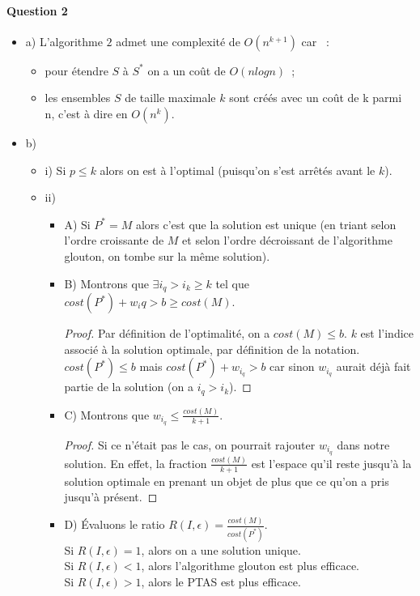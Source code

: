 \paragraph{Question 2}
\begin{itemize}
\item a) L'algorithme $2$ admet une complexité de $O(n^{k+1})$ car ~:
\begin{itemize}
\item pour étendre $S$ à $S^*$ on a un coût de $O(nlogn)$~;
\item les ensembles $S$ de taille maximale $k$ sont créés avec un coût
de k parmi n, c'est à dire en $O(n^k)$.
\end{itemize}
\item b)
\begin{itemize}
\item i) Si $p \leq k$ alors on est à l'optimal (puisqu'on s'est
arrêtés avant le $k$).
\item ii)
\begin{itemize}
\item A) Si $P^*=M$ alors c'est que la solution est unique (en triant
selon l'ordre croissante de $M$ et selon l'ordre décroissant de
l'algorithme glouton, on tombe sur la même solution).
\item B) Montrons que $\exists i_q > i_k \geq k$ tel que
$cost(P^*)+w_iq > b \geq cost(M)$.
\begin{proof}
Par définition de l'optimalité, on a $cost(M) \leq b$. $k$ est
l'indice associé à la solution optimale, par définition de la
notation. \\
$cost(P^*) \leq b$ mais $cost(P^*) + w_{i_q} > b$ car sinon $w_{i_q}$
aurait déjà fait partie de la solution (on a $i_q > i_k$). 
\end{proof}
\item C) Montrons que $w_{i_q} \leq \frac{cost(M)}{k+1}$.
\begin{proof}
Si ce n'était pas le cas, on pourrait rajouter $w_{i_q}$ dans
notre solution. En effet, la fraction $\frac{cost(M)}{k+1}$ est
l'espace qu'il reste jusqu'à la solution optimale en prenant un objet
de plus que ce qu'on a pris jusqu'à présent.
\end{proof}
\item D) Évaluons le ratio $R(I, \epsilon)
= \frac{cost(M)}{cost(P^*)}$. \\
Si $R(I, \epsilon) = 1$, alors on a une solution unique. \\
Si $R(I, \epsilon) < 1$, alors l'algorithme glouton est plus efficace. \\
Si $R(I, \epsilon) > 1$, alors le PTAS est plus efficace. \\
\end{itemize}
\end{itemize}
\end{itemize}
